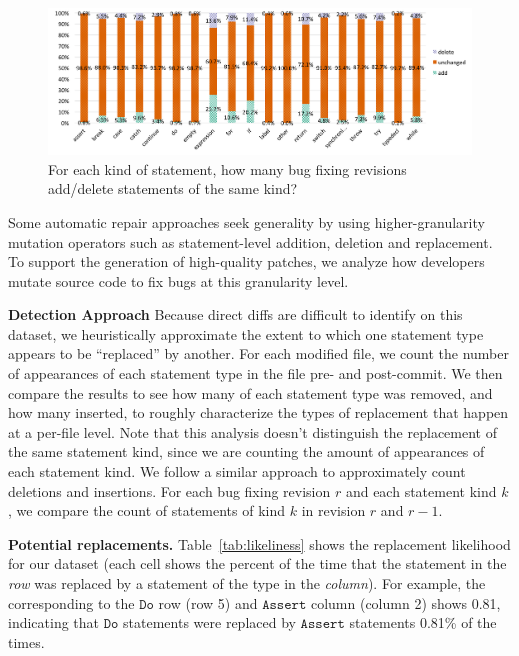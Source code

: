 \documentclass{sig-alternate-05-2015}
\begin{document}
\begin{figure}[!t] \centering \includegraphics[width=\textwidth]{StmtType}
	\vspace{-0.7cm} \caption{For each kind of statement, how many
	bug fixing revisions add/delete statements of the same kind?}
	\label{fig:StmtType} \end{figure}


Some automatic repair approaches seek generality by using
higher-granularity mutation operators such as statement-level addition, deletion and replacement. To
support the generation of high-quality patches, we 
analyze how developers mutate source code to fix bugs at this granularity
level. 

\vspace{1ex}
\noindent\textbf{Detection Approach}
Because direct diffs are difficult to identify on this dataset, we heuristically approximate the
extent to which one statement type appears to be ``replaced'' by another.
For each modified file, we count the number of
appearances of each statement type in the file pre- and post-commit.  We then
compare the results to see how many of each statement type was removed, and how
many inserted, to roughly characterize the types of replacement that happen at a
per-file level.
Note that this analysis doesn't distinguish the
replacement of the same statement kind, since we are counting the amount of
appearances of each statement kind.
%
We follow a similar approach to approximately count deletions and
insertions. 
For each bug fixing revision $r$ and each statement kind $k$, we compare the
count of statements of kind $k$ in revision $r$ and $r-1$.

\vspace{1ex}
\noindent\textbf{Potential replacements.} Table~\ref{tab:likeliness} shows
the replacement likelihood for our dataset 
(each cell shows the percent of the time that the statement in the \emph{row}
was replaced by a statement of the type in the \emph{column}). For example, 
the corresponding to the $\mathtt{Do}$ row (row 5) and $\mathtt{Assert}$ column (column 2)
shows 0.81, indicating that $\mathtt{Do}$ statements were
replaced by $\mathtt{Assert}$ statements 0.81\% of the times.
\end{document}
